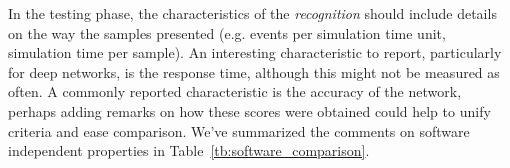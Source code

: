 
In the testing phase, the characteristics of the \emph{recognition} should include details on the way the samples presented (e.g. events per simulation time unit, simulation time per sample). An interesting characteristic to report, particularly for deep networks, is the response time, although this might not be measured as often. A commonly reported characteristic is the accuracy of the network, perhaps adding remarks on how these scores were obtained could help to unify criteria and ease comparison. We've summarized the comments on software independent properties in Table~\ref{tb:software_comparison}.











